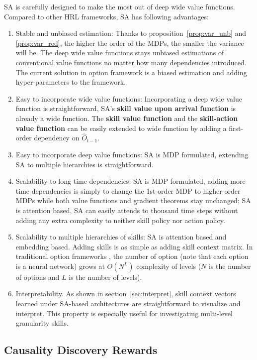 SA is carefully designed to make the most out of deep wide value
functions. Compared to other HRL frameworks, SA has following
advantages: 

\begin{enumerate}
\item Stable and unbiased estimation: Thanks to
  proposition~\ref{prop:var_unb} and \ref{prop:var_red}, the
  higher the order of the MDPs, the smaller the variance will be.
  The deep wide value functions stays unbiased estimations of
  conventional value functions no matter how many dependencies
  introduced. The current solution in option framework is a
  biased estimation \cite{harb2018waiting} and adding
  hyper-parameters to the framework.
\item Easy to incorporate wide value functions: Incorporating a
  deep wide value function is straightforward, SA's \textbf{skill
    value upon arrival function} is already a wide function. The
  \textbf{skill value function} and the \textbf{skill-action
    value function} can be easily extended to wide function by
  adding a first-order dependency on $\hat{O}_{t-1}$.
\item Easy to incorporate deep value functions: SA is MDP
  formulated, extending SA to multiple hierarchies is
  straightforward.
\item Scalability to long time dependencies: SA is MDP
  formulated, adding more time dependencies is simply to change
  the 1st-order MDP to higher-order MDPs while both value
  functions and gradient theorems stay unchanged; SA is attention
  based, SA can easily attends to thousand time steps without
  adding any extra complexity to neither skill policy nor action
  policy.
\item Scalability to multiple hierarchies of skills: SA is
  attention based and embedding based. Adding skills is as simple
  as adding skill context matrix. In traditional option
  frameworks \cite{riemer2018learning}, the number of option
  (note that each option is a neural network) grows at $O(N^L)$
  complexity of levels ($N$ is the number of options and $L$ is
  the number of levels).
\item Interpretability. As shown in section~\ref{sec:interpret},
  skill context vectors learned under SA-based architectures are
  straightforward to visualize and interpret. This property is
  especially useful for investigating multi-level granularity
  skills.
\end{enumerate}

\subsection{Causality Discovery Rewards}
\label{sec:append_causal_rew}

